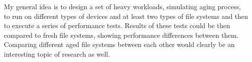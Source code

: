 \documentclass[color]{fithesis3}
\begin{document}
My general idea is to design a set of heavy workloads, simulating aging process, to run on different types of devices and at least two types of file systems and then to execute a series of performance tests. Results of these tests could be then compared to fresh file systems, showing performance differences between them. Comparing different aged file systems between each other would clearly be an interesting topic of research as well.




\end{document}
